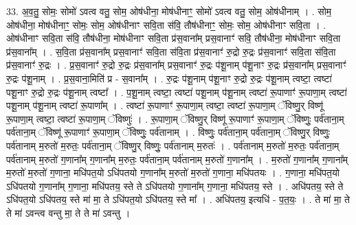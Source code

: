 \documentclass[17pt]{extarticle}
\begin{document}
33. अ॒व॒तु॒ सोमः॒ सोमो॑ ऽवत्व वतु॒ सोम॒ ओष॑धीना॒ मोष॑धीनाꣳ॒॒ सोमो॑ ऽवत्व वतु॒ सोम॒ ओष॑धीनाम् । . सोम॒ ओष॑धीना॒ मोष॑धीनाꣳ॒॒ सोमः॒ सोम॒ ओष॑धीनाꣳ सवि॒ता स॑वि॒ तौष॑धीनाꣳ॒॒ सोमः॒ सोम॒ ओष॑धीनाꣳ सवि॒ता । . ओष॑धीनाꣳ सवि॒ता स॑वि॒ तौष॑धीना॒ मोष॑धीनाꣳ सवि॒ता प्र॑स॒वाना᳚म् प्रस॒वानाꣳ॑ 
सवि॒ तौष॑धीना॒ मोष॑धीनाꣳ सवि॒ता प्र॑स॒वाना᳚म् । . स॒वि॒ता प्र॑स॒वाना᳚म् प्रस॒वानाꣳ॑ सवि॒ता स॑वि॒ता प्र॑स॒वानाꣳ॑ रु॒द्रो रु॒द्रः प्र॑स॒वानाꣳ॑ सवि॒ता स॑वि॒ता प्र॑स॒वानाꣳ॑ रु॒द्रः । . प्र॒स॒वानाꣳ॑ रु॒द्रो रु॒द्रः प्र॑स॒वाना᳚म् प्रस॒वानाꣳ॑ रु॒द्रः प॑शू॒नाम् प॑शू॒नाꣳ रु॒द्रः प्र॑स॒वाना᳚म् प्रस॒वानाꣳ॑ रु॒द्रः प॑शू॒नाम् । . प्र॒स॒वाना॒मिति॑ प्र - स॒वाना᳚म् । . रु॒द्रः प॑शू॒नाम् प॑शू॒नाꣳ रु॒द्रो रु॒द्रः प॑शू॒नाम् त्वष्टा॒ त्वष्टा॑ पशू॒नाꣳ रु॒द्रो रु॒द्रः प॑शू॒नाम् त्वष्टा᳚ । . प॒शू॒नाम् त्वष्टा॒ त्वष्टा॑ पशू॒नाम् प॑शू॒नाम् त्वष्टा॑ रू॒पाणाꣳ॑ रू॒पाणा॒म् त्वष्टा॑ पशू॒नाम् प॑शू॒नाम् त्वष्टा॑ रू॒पाणा᳚म् । . त्वष्टा॑ रू॒पाणाꣳ॑ रू॒पाणा॒म् त्वष्टा॒ त्वष्टा॑ रू॒पाणा॒म् ॅविष्णु॒र् विष्णू॑ रू॒पाणा॒म् त्वष्टा॒ त्वष्टा॑ 
रू॒पाणा॒म् ॅविष्णुः॑ । . रू॒पाणा॒म् ॅविष्णु॒र् विष्णू॑ रू॒पाणाꣳ॑ रू॒पाणा॒म् ॅविष्णुः॒ पर्व॑ताना॒म् पर्व॑ताना॒म् ॅविष्णू॑ रू॒पाणाꣳ॑ रू॒पाणा॒म् ॅविष्णुः॒ पर्व॑तानाम् । . विष्णुः॒ पर्व॑ताना॒म् पर्व॑ताना॒म् ॅविष्णु॒र् विष्णुः॒ पर्व॑तानाम् म॒रुतो॑ म॒रुतः॒ पर्व॑ताना॒म् ॅविष्णु॒र् विष्णुः॒ पर्व॑तानाम् म॒रुतः॑ । . पर्व॑तानाम् म॒रुतो॑ म॒रुतः॒ पर्व॑ताना॒म् पर्व॑तानाम् म॒रुतो॑ ग॒णाना᳚म् ग॒णाना᳚म् म॒रुतः॒ पर्व॑ताना॒म् 
पर्व॑तानाम् म॒रुतो॑ ग॒णाना᳚म् । . म॒रुतो॑ ग॒णाना᳚म् ग॒णाना᳚म् म॒रुतो॑ म॒रुतो॑ ग॒णाना॒ मधि॑पत॒यो ऽधि॑पतयो ग॒णाना᳚म् म॒रुतो॑ 
म॒रुतो॑ ग॒णाना॒ मधि॑पतयः । . ग॒णाना॒ मधि॑पत॒यो ऽधि॑पतयो ग॒णाना᳚म् ग॒णाना॒ मधि॑पतय॒ स्ते ते ऽधि॑पतयो ग॒णाना᳚म् ग॒णाना॒ मधि॑पतय॒ स्ते । . अधि॑पतय॒ स्ते ते ऽधि॑पत॒यो ऽधि॑पतय॒ स्ते मा॑ मा॒ ते ऽधि॑पत॒यो ऽधि॑पतय॒ स्ते मा᳚ । . अधि॑पतय॒ इत्यधि॑ - प॒त॒यः॒ । . ते मा॑ मा॒ ते ते मा॑ ऽवन्त्व वन्तु मा॒ ते ते मा॑ ऽवन्तु । \newline
\end{document}
